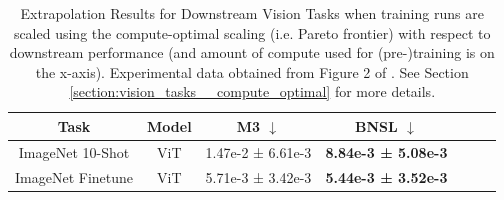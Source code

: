 \documentclass{article} %
\newcommand{\highlight}[1]{\colorbox{blue!10}{#1}}
\begin{document}
\begin{table}[hbt!]
    \centering
    \begin{tabular}{ |cc|c|c|c|c|c| } 
\hline
Task & Model & M3 $\downarrow$ & BNSL $\downarrow$\\
 \hline
 
ImageNet 10-Shot & ViT & 1.47e-2 ± 6.61e-3 & \bfseries 8.84e-3 ± 5.08e-3\\
 ImageNet Finetune & ViT & 5.71e-3 ± 3.42e-3 & \bfseries 5.44e-3 ± 3.52e-3 \\
 \hline
\end{tabular}
\vspace{-1.6mm}
    \caption{
    Extrapolation Results for Downstream Vision Tasks when training runs are scaled using the compute-optimal scaling (i.e. Pareto frontier) with respect to downstream performance (and amount of compute used for (pre-)training is on the x-axis). Experimental data obtained from Figure 2 of \cite{DBLP:journals/corr/abs-2106-04560}. See Section \ref{section:vision_tasks__compute_optimal} for more details.
    }
    \label{table:vision_compute_scaling}
\end{table}

\vspace{-1.6mm}

\FloatBarrier
\end{document}
